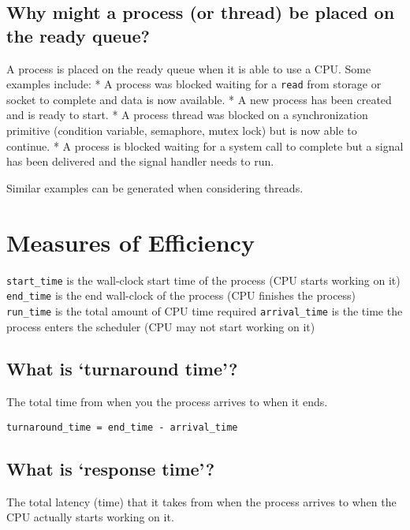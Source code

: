 \subsection{Why might a process (or thread) be placed on the ready
queue?}\label{why-might-a-process-or-thread-be-placed-on-the-ready-queue}

A process is placed on the ready queue when it is able to use a CPU.
Some examples include: * A process was blocked waiting for a
\texttt{read} from storage or socket to complete and data is now
available. * A new process has been created and is ready to start. * A
process thread was blocked on a synchronization primitive (condition
variable, semaphore, mutex lock) but is now able to continue. * A
process is blocked waiting for a system call to complete but a signal
has been delivered and the signal handler needs to run.

Similar examples can be generated when considering threads.

\section{Measures of Efficiency}\label{measures-of-efficiency}

\texttt{start\_time} is the wall-clock start time of the process (CPU
starts working on it) \texttt{end\_time} is the end wall-clock of the
process (CPU finishes the process) \texttt{run\_time} is the total
amount of CPU time required \texttt{arrival\_time} is the time the
process enters the scheduler (CPU may not start working on it)

\subsection{\texorpdfstring{What is `turnaround
time'?}{What is turnaround time?}}\label{what-is-turnaround-time}

The total time from when you the process arrives to when it ends.

\texttt{turnaround\_time\ =\ end\_time\ -\ arrival\_time}

\subsection{\texorpdfstring{What is `response
time'?}{What is response time?}}\label{what-is-response-time}

The total latency (time) that it takes from when the process arrives to
when the CPU actually starts working on it.

